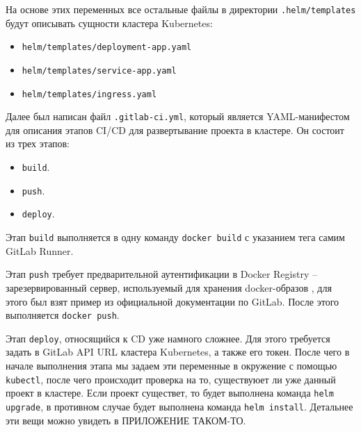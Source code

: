 На основе этих переменных все остальные файлы в директории \texttt{.helm/templates} будут описывать сущности кластера Kubernetes:

\begin{itemize}
    \item \texttt{helm/templates/deployment-app.yaml}
    \item \texttt{helm/templates/service-app.yaml}
    \item \texttt{helm/templates/ingress.yaml}
\end{itemize}

Далее был написан файл \texttt{.gitlab-ci.yml}, который является YAML-манифестом для описания этапов CI/CD для развертывание проекта в кластере. Он состоит из трех этапов:

\begin{itemize}
    \item \texttt{build}.
    \item \texttt{push}.
    \item \texttt{deploy}.
\end{itemize}

Этап \texttt{build} выполняется в одну команду \texttt{docker build} с указанием тега самим GitLab Runner.

Этап \texttt{push} требует предварительной аутентификации в Docker Registry -- зарезервированный сервер, используемый для хранения docker-образов \cite{def:docker},
для этого был взят пример из официальной документации по GitLab. После этого выполняется \texttt{docker push}.

Этап \texttt{deploy}, относящийся к CD уже намного сложнее. Для этого требуется задать в GitLab API
URL
кластера Kubernetes, а также его токен.
После чего в начале выполнения этапа мы задаем эти переменные в окружение с помощью \texttt{kubectl},
после чего происходит проверка на то, существуюет ли уже данный проект в кластере. Если проект существет, то будет выполнена команда \texttt{helm upgrade}, в противном случае будет выполнена команда \texttt{helm install}. Детальнее эти вещи можно увидеть в ПРИЛОЖЕНИЕ ТАКОМ-ТО.

